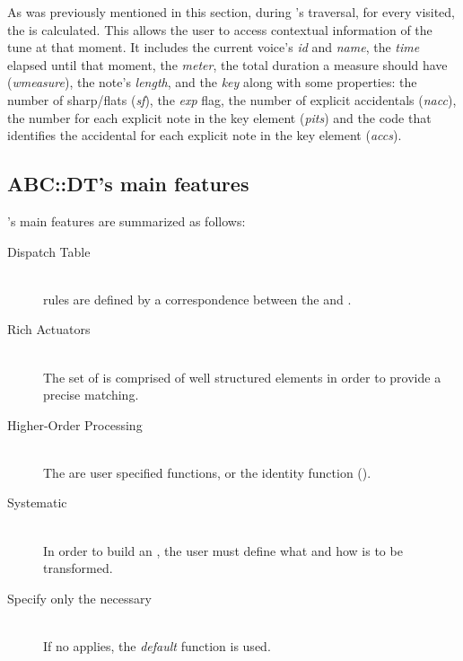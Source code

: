 As was previously mentioned in this section, during \dt{}'s traversal, for every \abcelement{}
visited, the \context{} is calculated. This \context{} allows the user to access contextual
information of the tune at that moment. It includes the current voice's \emph{id} and \emph{name},
the \emph{time} elapsed until that moment, the \emph{meter}, the total duration a measure should
have (\emph{wmeasure}), the note's \emph{length}, and the \emph{key} along with some properties: the
number of sharp/flats (\emph{sf}), the \emph{exp} flag, the number of explicit accidentals
(\emph{nacc}), the \midi{} number for each explicit note in the key element (\emph{pits}) and the
code that identifies the accidental for each explicit note in the key element (\emph{accs}).

\subsection{ABC::DT's main features}

\abcdt{}'s main features are summarized as follows:

\begin{description}
  \item[Dispatch Table] \hfill \\
    \abcdt{} rules are defined by a correspondence between the \actuators{} and \transformations{}.
  \item[Rich Actuators] \hfill \\
    The set of \actuators{} is comprised of well structured elements in order to provide a precise
    \abcelements{} matching.
  \item[Higher-Order Processing] \hfill \\
    The \transformations{} are user specified functions, or the identity function (\toabc{}).
  \item[Systematic] \hfill \\
    In order to build an \abcpt{}, the user must define what and how is to be transformed.
  \item[Specify only the necessary] \hfill \\
    If no \actuator{} applies, the \emph{default} function is used.
\end{description}

